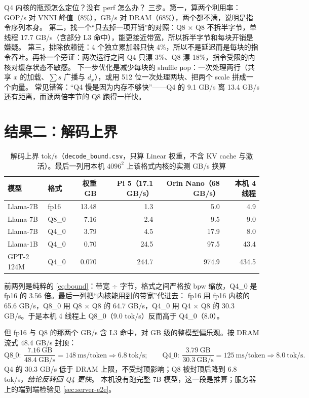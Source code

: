\documentclass[11pt,a4paper]{ctexart}
\begin{document}
\begin{iqbox}{Q4 内核的瓶颈怎么定位？没有 perf 怎么办？}
三步。第一，算两个利用率：GOP/s 对 VNNI 峰值（8\%），GB/s 对 DRAM（68\%），两个都不满，说明是指令序列本身。
第二，找一个“只去掉一项开销”的对照：Q8 × Q8 不拆半字节，单线程 17.7 GB/s（含部分 L3 命中），能更接近带宽，所以拆半字节和每块开销是嫌疑。
第三，排除依赖链：4 个独立累加器只快 4\%，所以不是延迟而是每块的指令吞吐。再补一个旁证：两次运行之间 Q4 只漂 3\%、Q8 漂 18\%，指令受限的内核对缓存状态不敏感。
下一步优化是减少每块的 shuffle µop：一次处理两行（共享 $x$ 的加载、$\sum s$ 广播与 $d_x$），或用 512 位一次处理两块、把两个 scale 拼成一个向量。
常见错答：“Q4 慢是因为内存不够快”——Q4 的 9.1 GB/s 离 13.4 GB/s 还有距离，而读两倍字节的 Q8 跑得一样快。
\end{iqbox}

\section{结果二：解码上界}\label{sec:res-bound}

\begin{table}[H]
\centering\small
\caption{解码上界 tok/s（\texttt{decode\_bound.csv}，只算 Linear 权重，不含 KV cache 与激活）。最后一列用本机 $4096^2$ 上该格式内核的实测 GB/s 换算}\label{tab:bound}
\begin{tabular}{llrrrr}
\toprule
模型 & 格式 & 权重 GB & Pi 5（17.1 GB/s） & Orin Nano（68 GB/s） & 本机 4 线程 \\
\midrule
Llama-7B & fp16 & 13.48 & 1.3 & 5.0 & 4.9 \\
Llama-7B & Q8\_0 & 7.16 & 2.4 & 9.5 & 9.0 \\
Llama-7B & Q4\_0 & 3.79 & 4.5 & 17.9 & 8.0 \\
Llama-1B & Q4\_0 & 0.70 & 24.5 & 97.5 & 43.4 \\
GPT-2 124M & Q4\_0 & 0.070 & 244.7 & 974.9 & 434.5 \\
\bottomrule
\end{tabular}
\end{table}

前两列是纯粹的 \cref{eq:bound}：带宽 ÷ 字节，格式之间严格按 bpw 缩放，Q4\_0 是 fp16 的 3.56 倍。最后一列把“内核能用到的带宽”代进去：
fp16 用 fp16 内核的 65.6 GB/s，Q8\_0 用 Q8 × Q8 的 64.7 GB/s，Q4\_0 用 Q4 × Q8 的 30.3 GB/s。于是本机 4 线程上 Q8\_0（9.0 tok/s）反而高于 Q4\_0（8.0）。

但 fp16 与 Q8 的那两个 GB/s 含 L3 命中，对 GB 级的整模型偏乐观。按 DRAM 流式 48.4 GB/s 封顶：
\begin{equation}
\text{Q8\_0}:\ \frac{7.16\ \text{GB}}{48.4\ \text{GB/s}} = 148\ \text{ms/token} \Rightarrow 6.8\ \text{tok/s};\qquad
\text{Q4\_0}:\ \frac{3.79\ \text{GB}}{30.3\ \text{GB/s}} = 125\ \text{ms/token} \Rightarrow 8.0\ \text{tok/s}.
\end{equation}
Q4 的 30.3 GB/s 低于 DRAM 上限，不受封顶影响；Q8 被封顶后降到 6.8 tok/s，\emph{结论反转回 Q4 更快}。
本机没有跑完整 7B 模型，这一段是推算；服务器上的端到端检验见 \cref{sec:server-e2e}。
\end{document}
